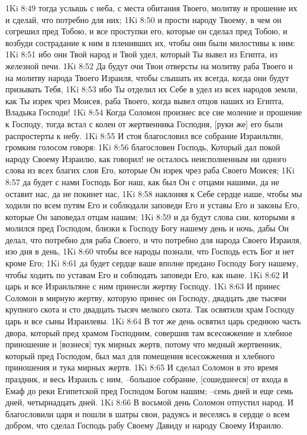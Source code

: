 1Ki 8:49  тогда услышь с неба, с места обитания Твоего, молитву и прошение их и сделай, что потребно для них;
1Ki 8:50  и прости народу Твоему, в чем он согрешил пред Тобою, и все проступки его, которые он сделал пред Тобою, и возбуди сострадание к ним в пленивших их, чтобы они были милостивы к ним:
1Ki 8:51  ибо они Твой народ и Твой удел, который Ты вывел из Египта, из железной печи.
1Ki 8:52  Да будут очи Твои отверсты на молитву раба Твоего и на молитву народа Твоего Израиля, чтобы слышать их всегда, когда они будут призывать Тебя,
1Ki 8:53  ибо Ты отделил их Себе в удел из всех народов земли, как Ты изрек чрез Моисея, раба Твоего, когда вывел отцов наших из Египта, Владыка Господи!
1Ki 8:54  Когда Соломон произнес все сие моление и прошение к Господу, тогда встал с колен от жертвенника Господня, [руки же] его были распростерты к небу.
1Ki 8:55  И стоя благословил все собрание Израильтян, громким голосом говоря:
1Ki 8:56  благословен Господь, Который дал покой народу Своему Израилю, как говорил! не осталось неисполненным ни одного слова из всех благих слов Его, которые Он изрек чрез раба Своего Моисея;
1Ki 8:57  да будет с нами Господь Бог наш, как был Он с отцами нашими, да не оставит нас, да не покинет нас,
1Ki 8:58  наклоняя к Себе сердце наше, чтобы мы ходили по всем путям Его и соблюдали заповеди Его и уставы Его и законы Его, которые Он заповедал отцам нашим;
1Ki 8:59  и да будут слова сии, которыми я молился пред Господом, близки к Господу Богу нашему день и ночь, дабы Он делал, что потребно для раба Своего, и что потребно для народа Своего Израиля, изо дня в день,
1Ki 8:60  чтобы все народы познали, что Господь есть Бог и нет кроме Его;
1Ki 8:61  да будет сердце ваше вполне предано Господу Богу нашему, чтобы ходить по уставам Его и соблюдать заповеди Его, как ныне.
1Ki 8:62  И царь и все Израильтяне с ним принесли жертву Господу.
1Ki 8:63  И принес Соломон в мирную жертву, которую принес он Господу, двадцать две тысячи крупного скота и сто двадцать тысяч мелкого скота. Так освятили храм Господу царь и все сыны Израилевы.
1Ki 8:64  В тот же день освятил царь среднюю часть двора, который пред храмом Господним, совершив там всесожжение и хлебное приношение и [вознеся] тук мирных жертв, потому что медный жертвенник, который пред Господом, был мал для помещения всесожжения и хлебного приношения и тука мирных жертв.
1Ki 8:65  И сделал Соломон в это время праздник, и весь Израиль с ним, --большое собрание, [сошедшееся] от входа в Емаф до реки Египетской пред Господом Богом нашим; --семь дней и еще семь дней, четырнадцать дней.
1Ki 8:66  В восьмой день Соломон отпустил народ. И благословили царя и пошли в шатры свои, радуясь и веселясь в сердце о всем добром, что сделал Господь рабу Своему Давиду и народу Своему Израилю.
